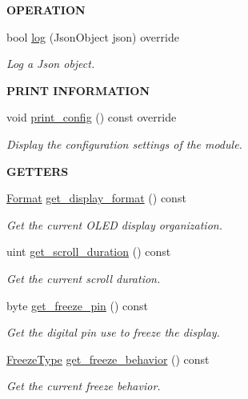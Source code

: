 \begin{Indent}{\bf O\+P\+E\+R\+A\+T\+I\+ON}\par
\begin{DoxyCompactItemize}
\item 
bool \hyperlink{class_loom___o_l_e_d_a288f75a9eb423bda9b65b8cb4c7708b8}{log} (Json\+Object json) override
\begin{DoxyCompactList}\small\item\em Log a Json object. \end{DoxyCompactList}\end{DoxyCompactItemize}
\end{Indent}
\begin{Indent}{\bf P\+R\+I\+NT I\+N\+F\+O\+R\+M\+A\+T\+I\+ON}\par
\begin{DoxyCompactItemize}
\item 
void \hyperlink{class_loom___o_l_e_d_a20dab0bc2c5bdc139b1b04523a54a78c}{print\+\_\+config} () const override
\begin{DoxyCompactList}\small\item\em Display the configuration settings of the module. \end{DoxyCompactList}\end{DoxyCompactItemize}
\end{Indent}
\begin{Indent}{\bf G\+E\+T\+T\+E\+RS}\par
\begin{DoxyCompactItemize}
\item 
\hyperlink{class_loom___o_l_e_d_aade282dab7eb118271f73b3b3bfc0ffd}{Format} \hyperlink{class_loom___o_l_e_d_ac76bb31bcfb46076a0e72f59025ba3cb}{get\+\_\+display\+\_\+format} () const 
\begin{DoxyCompactList}\small\item\em Get the current O\+L\+ED display organization. \end{DoxyCompactList}\item 
uint \hyperlink{class_loom___o_l_e_d_a1460b24e59ea1dff3dd8605a0a9a9564}{get\+\_\+scroll\+\_\+duration} () const 
\begin{DoxyCompactList}\small\item\em Get the current scroll duration. \end{DoxyCompactList}\item 
byte \hyperlink{class_loom___o_l_e_d_a6ca6b64ea5c2a5d78733f9675f409efb}{get\+\_\+freeze\+\_\+pin} () const 
\begin{DoxyCompactList}\small\item\em Get the digital pin use to freeze the display. \end{DoxyCompactList}\item 
\hyperlink{class_loom___o_l_e_d_adedc20c1c901fe472d976c722abf0bb9}{Freeze\+Type} \hyperlink{class_loom___o_l_e_d_a40d29eabfcdf35863dc2f1f5eca0b945}{get\+\_\+freeze\+\_\+behavior} () const 
\begin{DoxyCompactList}\small\item\em Get the current freeze behavior. \end{DoxyCompactList}\end{DoxyCompactItemize}
\end{Indent}
